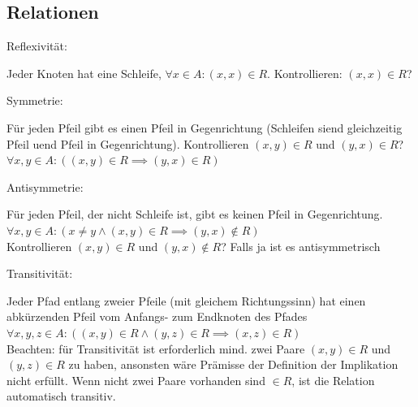 \documentclass[8pt,landscape]{scrartcl}
\begin{document}
\begin{multicols}{3}
\section{Relationen}

\begin{bf}Reflexivit\"at:\end{bf} Jeder Knoten hat eine Schleife, $\forall x \in A: (x, x) \in R$.
Kontrollieren: $(x, x) \in R$?\\
\begin{bf}Symmetrie:\end{bf} F\"ur jeden Pfeil gibt es einen Pfeil in Gegenrichtung (Schleifen siend gleichzeitig Pfeil uend Pfeil in Gegenrichtung).
Kontrollieren $(x, y) \in R$ und $(y, x) \in R$?\\
$\forall x, y \in A : \left( (x, y) \in R \implies (y, x) \in R \right)$\\ 
\begin{bf}Antisymmetrie:\end{bf} F\"ur jeden Pfeil, der nicht Schleife ist, gibt es keinen Pfeil in Gegenrichtung.\\
$\forall x, y \in A : \left( x \neq y \land (x, y) \in R \implies (y, x) \not\in R \right)$\\ 
Kontrollieren $(x, y) \in R$ und $(y, x) \not\in R$? Falls ja ist es antisymmetrisch\\
\begin{bf}Transitivit\"at:\end{bf} Jeder Pfad entlang zweier Pfeile (mit gleichem Richtungssinn) hat einen abk\"urzenden Pfeil vom Anfangs- zum Endknoten des Pfades\\
$\forall x, y, z \in A: \left( (x, y) \in R \land (y, z) \in R \implies (x, z) \in R \right)$\\
Beachten: f\"ur Transitivit\"at ist erforderlich mind. zwei Paare $(x, y) \in R$ und $(y, z) \in R$ zu haben, ansonsten w\"are Pr\"amisse der Definition der Implikation nicht erf\"ullt.
Wenn nicht zwei Paare vorhanden sind $\in R$, ist die Relation automatisch transitiv.




\end{multicols}
\end{document}
